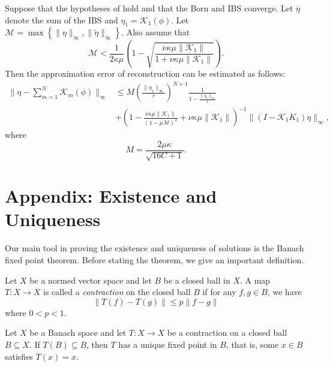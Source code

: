 \documentclass[a4paper, 12pt]{article}
\begin{document}
\begin{thm} Suppose that the hypotheses of  hold and that the Born and IBS converge.
	Let $\overline{\eta}$ denote the sum of the IBS and $\eta_1 = \mathcal{K}_{1}\left( \phi \right)$.
	Let $\mathcal{M} = \max \left\{ \lVert \eta \rVert_{\infty}, \lVert \tilde{\eta} \rVert_{\infty} \right\} $.
	Also assume that
	\begin{equation}\label{convgerror}
		\mathcal{M} < \frac{1}{2\kappa \mu}\left( 1 - \sqrt{\frac{\nu\kappa\mu \lVert \mathcal{K}_{1} \rVert}{1 + \nu\kappa\mu \lVert \mathcal{K}_{1} \rVert}}\right)
	.\end{equation}
Then the approximation error of reconstruction can be estimated as follows:
\begin{align*}
	\lVert \eta - \sum_{m=1}^{N} \mathcal{K}_{m}\left( \phi \right)  \rVert_{\infty}
	&\le M\left( \frac{\lVert \eta_1 \rVert_{\infty}}{r} \right)^{N + 1}\frac{1}{1-\frac{\lVert \eta_1 \rVert_{\infty}}{r}}\\
	&+ \left( 1-\frac{\nu\kappa\mu \lVert \mathcal{K}_{1} \rVert}{\left( 1-\mu \mathcal{M} \right)^2} + \nu\kappa\mu \lVert \mathcal{K}_{1} \rVert \right)^{-1} \lVert \left( I-\mathcal{K}_{1}K_1 \right) \eta \rVert_{\infty}
,\end{align*}
where
\[
M = \frac{2\mu\kappa}{\sqrt{16C + 1}}
.\] 
\end{thm}
\section{Appendix: Existence and Uniqueness}\label{sec2}

Our main tool in proving the existence and uniqueness of solutions is the Banach fixed point theorem.
Before stating the theorem, we give an important definition.

\begin{defn}
	Let $X$ be a normed vector space and let $B$ be a closed ball in $X$.
	A map $T\colon X\to X$ is called a \textit{contraction} on the closed ball $B$ if for any $f,g \in B$, we have
	\[
	\lVert T\left( f \right) -T\left( g \right) \rVert \le p \lVert f-g \rVert
	\]
	where $0< p < 1$.
\end{defn}
\begin{thm}[Banach]\label{thm1}
	Let $X$ be a Banach space and let $T\colon X\to X$ be a contraction on a closed ball $B\subseteq X$.
	If $T\left( B \right) \subseteq B$, then $T$ has a unique fixed point in $B$, that is, some $x \in B$ satisfies $T\left( x \right) = x$.
\end{thm}
\end{document}
